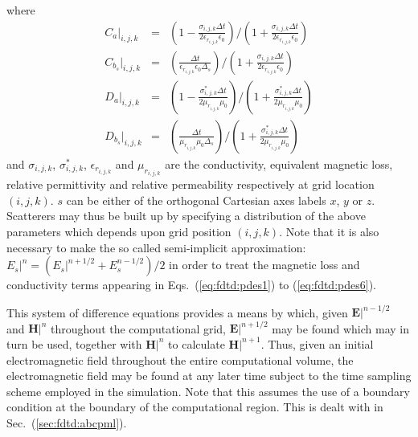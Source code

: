 \documentclass[a4paper, 12pt]{article}
\newcommand{\sect}[1]{Sec.\ (\ref{#1})}
\newcommand{\eqr}[2]{Eqs.\ (\ref{#1}) to (\ref{#2})}
\begin{document}
	where
	\begin{eqnarray}
		\label{eq:fdtd:ca}
		C_{a}|_{i,j,k}&=&\left(1-\frac{\sigma_{i,j,k}\Delta
			t}{2\epsilon_{r_{i,j,k}}\epsilon_0}\right)/\left(1+\frac{\sigma_{i,j,k}\Delta
			t}{2\epsilon_{r_{i,j,k}}\epsilon_0}\right)\\
		\label{eq:fdtd:cb}
		C_{b_s}|_{i,j,k}&=&\left(\frac{\Delta t}{\epsilon_{r_{i,j,k}}\epsilon_0\Delta_s}\right)/\left(1+\frac{\sigma_{i,j,k}\Delta
			t}{2\epsilon_{r_{i,j,k}}\epsilon_0}\right)\\
		\label{eq:fdtd:da}
		D_{a}|_{i,j,k}&=&\left(1-\frac{\sigma^*_{i,j,k}\Delta
			t}{2\mu_{r_{i,j,k}}\mu_0}\right)/\left(1+\frac{\sigma^*_{i,j,k}\Delta
			t}{2\mu_{r_{i,j,k}}\mu_0}\right)\\
		\label{eq:fdtd:db}
		D_{b_s}|_{i,j,k}&=&\left(\frac{\Delta t}{\mu_{r_{i,j,k}}\mu_0\Delta_s}\right)/\left(1+\frac{\sigma^*_{i,j,k}\Delta
			t}{2\mu_{r_{i,j,k}}\mu_0}\right)
	\end{eqnarray}
	and $\sigma_{i,j,k}$, $\sigma^*_{i,j,k}$, $\epsilon_{r_{i,j,k}}$ and
	$\mu_{r_{i,j,k}}$ are the conductivity, equivalent magnetic loss,
	relative permittivity and relative permeability respectively at grid
	location $(i,j,k)$. $s$ can be either of the orthogonal Cartesian axes
	labels $x$, $y$ or $z$. Scatterers may thus be built up by specifying a
	distribution of the above parameters which depends upon grid position
	$(i,j,k)$. Note that it is also necessary to make the so called
	semi-implicit approximation: $E_s|^n=(E_s|^{n+1/2}+E_s^{n-1/2})/2$ in
	order to treat the magnetic loss and conductivity terms appearing in \eqr{eq:fdtd:pdes1}{eq:fdtd:pdes6}.

	This system of difference equations provides a means by which, given
	$\mathbf{E}|^{n-1/2}$ and $\mathbf{H}|^n$ throughout the computational
	grid, $\mathbf{E}|^{n+1/2}$ may be
	found which may in turn be used, together with $\mathbf{H}|^n$ to
	calculate $\mathbf{H}|^{n+1}$. Thus, given an initial electromagnetic
	field throughout the entire computational volume, the electromagnetic
	field may be found at any later time subject to the time sampling
	scheme employed in the simulation. Note that this assumes the use of a
	boundary condition at the boundary of the computational region. This
	is dealt with in \sect{sec:fdtd:abcpml}.
\end{document}
